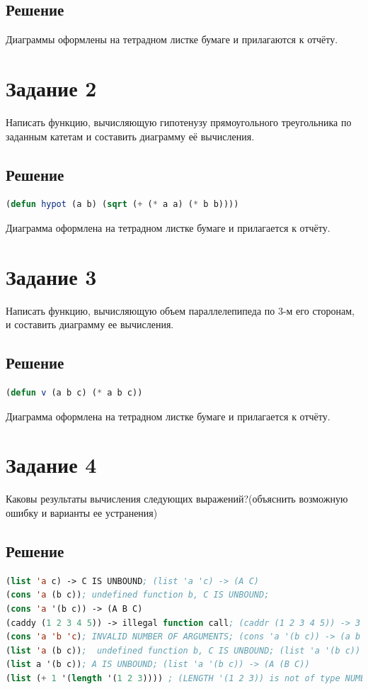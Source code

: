 \documentclass[12pt]{report}
\begin{document}
\subsection*{Решение}
Диаграммы оформлены на тетрадном листке бумаге и прилагаются к отчёту.

\section*{Задание 2}
Написать функцию, вычисляющую гипотенузу прямоугольного треугольника по заданным катетам и составить диаграмму её вычисления.
\subsection*{Решение}
\begin{lstlisting}[label=second,caption=Решение задания №2, language=lisp]
(defun hypot (a b) (sqrt (+ (* a a) (* b b))))
\end{lstlisting}
Диаграмма оформлена на тетрадном листке бумаге и прилагается к отчёту.

\section*{Задание 3}
Написать функцию, вычисляющую объем параллелепипеда по 3-м его сторонам, и составить диаграмму ее вычисления.

\subsection*{Решение}
\begin{lstlisting}[label=third,caption=Решение задания №3, language=lisp]
(defun v (a b c) (* a b c))
\end{lstlisting}
Диаграмма оформлена на тетрадном листке бумаге и прилагается к отчёту.

\section*{Задание 4}
Каковы результаты вычисления следующих выражений?(объяснить возможную ошибку и варианты ее устранения)
\subsection*{Решение}

\begin{lstlisting}[label=4xd,caption=Решение задания №4, language=lisp]
(list 'a c) -> C IS UNBOUND; (list 'a 'c) -> (A C)
(cons 'a (b c)); undefined function b, C IS UNBOUND; 
(cons 'a '(b c)) -> (A B C)
(caddy (1 2 3 4 5)) -> illegal function call; (caddr (1 2 3 4 5)) -> 3
(cons 'a 'b 'c); INVALID NUMBER OF ARGUMENTS; (cons 'a '(b c)) -> (a b c)
(list 'a (b c));  undefined function b, C IS UNBOUND; (list 'a '(b c)) -> (A (B C))
(list a '(b c)); A IS UNBOUND; (list 'a '(b c)) -> (A (B C))
(list (+ 1 '(length '(1 2 3)))) ; (LENGTH '(1 2 3)) is not of type NUMBER; (list (+ 1 (length '(1 2 3)))) -> (4)
\end{lstlisting}
\end{document}

